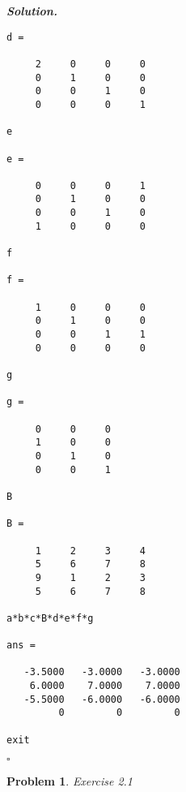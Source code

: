 \documentclass[12pt]{report}
\newtheorem{problem}{Problem}
\newenvironment{solution}[1][\it{Solution}]{\textbf{#1. } }{$\square$}
\begin{document}
\begin{solution}
\begin{verbatim}
d =

     2     0     0     0
     0     1     0     0
     0     0     1     0
     0     0     0     1

e

e =

     0     0     0     1
     0     1     0     0
     0     0     1     0
     1     0     0     0

f

f =

     1     0     0     0
     0     1     0     0
     0     0     1     1
     0     0     0     0

g

g =

     0     0     0
     1     0     0
     0     1     0
     0     0     1

B

B =

     1     2     3     4
     5     6     7     8
     9     1     2     3
     5     6     7     8

a*b*c*B*d*e*f*g

ans =

   -3.5000   -3.0000   -3.0000
    6.0000    7.0000    7.0000
   -5.5000   -6.0000   -6.0000
         0         0         0

exit
    \end{verbatim}
\end{solution}

\vskip 20pt



\begin{problem}
    Exercise 2.1
\end{problem}
\end{document}
